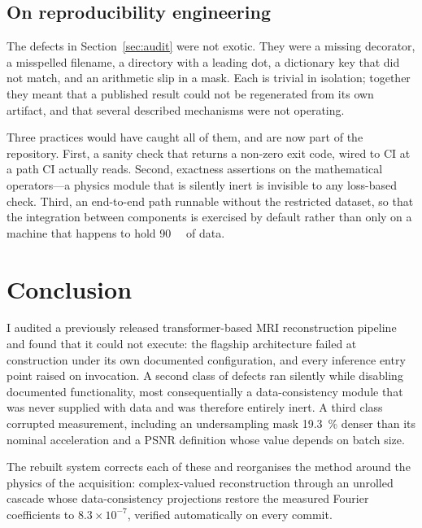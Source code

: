 \documentclass[11pt]{article}
\begin{document}
\subsection{On reproducibility engineering}

The defects in Section~\ref{sec:audit} were not exotic. They were a missing
decorator, a misspelled filename, a directory with a leading dot, a dictionary
key that did not match, and an arithmetic slip in a mask. Each is trivial in
isolation; together they meant that a published result could not be regenerated
from its own artifact, and that several described mechanisms were not operating.

Three practices would have caught all of them, and are now part of the
repository. First, a sanity check that returns a non-zero exit code, wired to CI
at a path CI actually reads. Second, exactness assertions on the mathematical
operators---a physics module that is silently inert is invisible to any
loss-based check. Third, an end-to-end path runnable without the restricted
dataset, so that the integration between components is exercised by default
rather than only on a machine that happens to hold \SI{90}{\giga\byte} of data.

\section{Conclusion}

I audited a previously released transformer-based MRI reconstruction pipeline
and found that it could not execute: the flagship architecture failed at
construction under its own documented configuration, and every inference entry
point raised on invocation. A second class of defects ran silently while
disabling documented functionality, most consequentially a data-consistency
module that was never supplied with data and was therefore entirely inert. A
third class corrupted measurement, including an undersampling mask
\SI{19.3}{\percent} denser than its nominal acceleration and a PSNR definition
whose value depends on batch size.

The rebuilt system corrects each of these and reorganises the method around the
physics of the acquisition: complex-valued reconstruction through an unrolled
cascade whose data-consistency projections restore the measured Fourier
coefficients to $8.3\times10^{-7}$, verified automatically on every commit.
\end{document}
